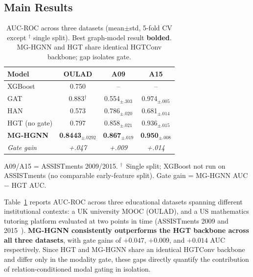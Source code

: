 \documentclass[sigconf,review]{acmart}
\begin{document}
\subsection{Main Results}

\begin{table}[t]
\centering
\small
\caption{AUC-ROC across three datasets (mean$\pm$std,
5-fold CV except $^\dagger$ single split). Best
graph-model result \textbf{bolded}. MG-HGNN and HGT
share identical HGTConv backbone; gap isolates gate.}
\label{tab:main_results}
\begin{tabular}{lccc}
\toprule
\textbf{Model} & \textbf{OULAD} & \textbf{A09} & \textbf{A15} \\
\midrule
XGBoost        & 0.750  & --    & -- \\
GAT            & 0.883$^\dagger$ & 0.554$_{\pm.303}$ & 0.974$_{\pm.005}$ \\
HAN            & 0.573  & 0.786$_{\pm.020}$ & 0.681$_{\pm.014}$ \\
HGT (no gate)  & 0.797  & 0.858$_{\pm.021}$ & 0.936$_{\pm.015}$ \\
\midrule
\textbf{MG-HGNN}
  & \textbf{0.8443}$_{\pm.0292}$
  & \textbf{0.867}$_{\pm.019}$
  & \textbf{0.950}$_{\pm.008}$ \\
\midrule
\textit{Gate gain}
  & \textit{+.047} & \textit{+.009} & \textit{+.014} \\
\bottomrule
\end{tabular}
\par\smallskip
{\footnotesize A09/A15 = ASSISTments 2009/2015.
$^\dagger$~Single split; XGBoost not run on
ASSISTments (no comparable early-feature split).
Gate gain = MG-HGNN AUC $-$ HGT AUC.}
\end{table}

Table~\ref{tab:main_results} reports AUC-ROC across
three educational datasets spanning different
institutional contexts: a UK university MOOC
(OULAD), and a US mathematics tutoring platform
evaluated at two points in time (ASSISTments 2009
and 2015~\citep{feng2009assistments,assistments2015}).
\textbf{MG-HGNN consistently outperforms
the HGT backbone across all three datasets}, with
gate gains of $+0.047$, $+0.009$, and $+0.014$
AUC respectively. Since HGT and MG-HGNN share an
identical HGTConv backbone and differ only in the
modality gate, these gaps directly quantify the
contribution of relation-conditioned modal gating
in isolation.
\end{document}
